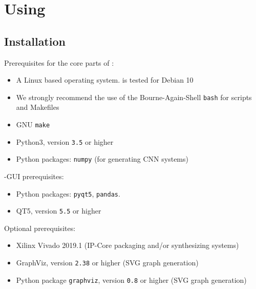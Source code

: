 




\chapter{Using \asterics}\label{ch:02-using} 



\section{Installation}
\label{sec:02-installation}

Prerequisites for the core parts of \asterics:

\begin{itemize}
\item A Linux based operating system. \asterics is tested for Debian 10
\item We strongly recommend the use of the Bourne-Again-Shell \texttt{bash} for \asterics scripts and Makefiles
\item GNU \texttt{make}
\item Python3, version \texttt{3.5} or higher
\item Python packages: \texttt{numpy} (for generating CNN systems)
\end{itemize}

\asterics-GUI prerequisites:

\begin{itemize}
\item Python packages: \texttt{pyqt5}, \texttt{pandas}.
\item QT5, version \texttt{5.5} or higher
\end{itemize}

Optional prerequisites:

\begin{itemize}
\item Xilinx Vivado 2019.1 (IP-Core packaging and/or synthesizing systems)
\item GraphViz, version \texttt{2.38} or higher (SVG graph generation)
\item Python package \texttt{graphviz}, version \texttt{0.8} or higher (SVG graph generation)
\end{itemize}


